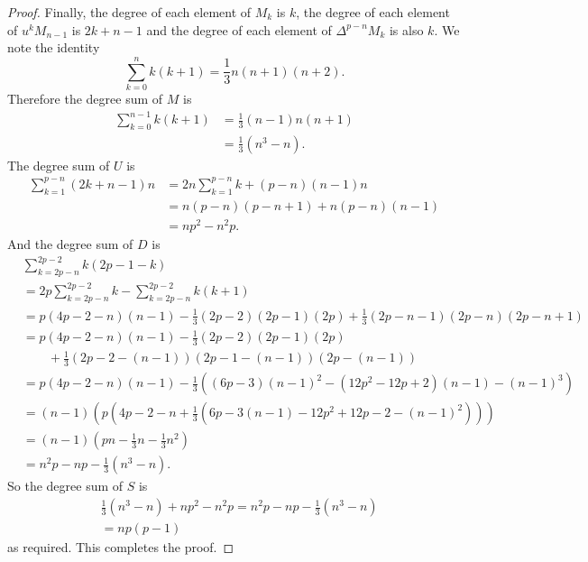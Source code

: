 \documentclass[10pt,a4paper]{amsart}
\begin{document}
\begin{proof}
Finally, the degree of each element of $M_k$ is $k$, the degree of each element of $u^kM_{n-1}$ is $2k+n-1$ and the degree of each element of $\Delta^{p-n}M_k$ is also $k$. We note the identity
\[\sum_{k=0}^n k(k+1) = \frac13 n(n+1)(n+2).\]
Therefore the degree sum of $M$ is
\begin{align*}
\sum_{k=0}^{n-1} k(k+1) &= \frac13(n-1)n(n+1)\\
&= \frac13 (n^3-n).
\end{align*}
The degree sum of $U$ is
\begin{align*}
\sum_{k=1}^{p-n} (2k+n-1)n &= 2n \sum_{k=1}^{p-n}k + (p-n)(n-1)n\\
&= n(p-n)(p-n+1)+n(p-n)(n-1)\\
&=np^2-n^2p.
\end{align*}
And the degree sum of $D$ is
\begin{align*}
&\sum_{k=2p-n}^{2p-2} k(2p-1-k)\\
&= 2p \sum_{k=2p-n}^{2p-2}k - \sum_{k=2p-n}^{2p-2}k(k+1)\\
&= p(4p-2-n)(n-1) - \frac13(2p-2)(2p-1)(2p) + \frac13 (2p-n-1)(2p-n)(2p-n+1)\\
&= p(4p-2-n)(n-1) - \frac13(2p-2)(2p-1)(2p)\\
& \qquad + \frac13 (2p-2-(n-1))(2p-1-(n-1))(2p-(n-1))\\
&= p(4p-2-n)(n-1) - \frac13\left((6p-3)(n-1)^2 - (12p^2-12p+2)(n-1)-(n-1)^3 \right)\\
&= (n-1)\left(p(4p-2-n+\frac13(6p-3(n-1)-12p^2+12p-2-(n-1)^2)) \right)\\
&= (n-1)(pn-\frac13n - \frac13n^2 )\\
&= n^2p-np-\frac13(n^3-n).
\end{align*}
So the degree sum of $S$ is
\begin{align*}
&\frac13 (n^3-n)+np^2-n^2p=n^2p-np-\frac13(n^3-n)\\
& = np(p-1)
\end{align*}
as required. This completes the proof.
\end{proof}
\end{document}
